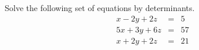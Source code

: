 \documentclass[12pt,letterpaper]{orulawork}
\newif\ifanswerkey
\newcommand{\answer}[1]{%
	\ifanswerkey%
		{\color{red}[Ans: #1]}%
	\fi%
}
\begin{document}
\begin{question}
	Solve the following set of equations by determinants.
	\begin{eqnarray*}
		x - 2y +2z & = & 5 \\
		5x + 3y + 6z & = & 57 \\
		x + 2y + 2z & = & 21 \\
	\end{eqnarray*} \answer{$\Delta=16$, $x=3$, $y=45$, and $z=5$}
\end{question}

\end{document}
